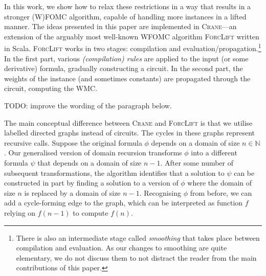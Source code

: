 \documentclass[letterpaper]{article} %
\newcommand{\Ctwo}{$\mathsf{C}^{2}$}
\theoremstyle{definition}
\theoremstyle{remark}
\begin{document}



In this work, we show how to relax these restrictions in a way that results in a
stronger (W)FOMC algorithm, capable of handling more instances in a lifted
manner. The ideas presented in this paper are implemented in
\textsc{Crane}---an extension of the arguably most well-known WFOMC algorithm
\textsc{ForcLift} written in Scala. \textsc{ForcLift} works in two stages:
compilation and evaluation/propagation.\footnote{There is also an intermediate
  stage called \emph{smoothing} that takes place between compilation and
  evaluation. As our changes to smoothing are quite elementary, we do not
  discuss them to not distract the reader from the main contributions of this
  paper.} In the first part, various \emph{(compilation) rules} are applied to
the input (or some derivative) formula, gradually constructing a circuit. In the
second part, the weights of the instance (and sometimes constants) are
propagated through the circuit, computing the WMC\@.


TODO: improve the wording of the paragraph below.

The main conceptual difference between \textsc{Crane} and \textsc{ForcLift} is
that we utilise labelled directed graphs instead of circuits. The cycles in
these graphs represent recursive calls. Suppose the original formula $\phi$
depends on a domain of size $n \in \mathbb{N}$. Our generalised version of
domain recursion transforms $\phi$ into a different formula $\psi$ that depends
on a domain of size $n-1$. After some number of subsequent transformations, the
algorithm identifies that a solution to $\psi$ can be constructed in part by
finding a solution to a version of $\phi$ where the domain of size $n$ is
replaced by a domain of size $n-1$. Recognising $\phi$ from before, we can add a
cycle-forming edge to the graph, which can be interpreted as function $f$
relying on $f(n-1)$ to compute $f(n)$.
\end{document}
